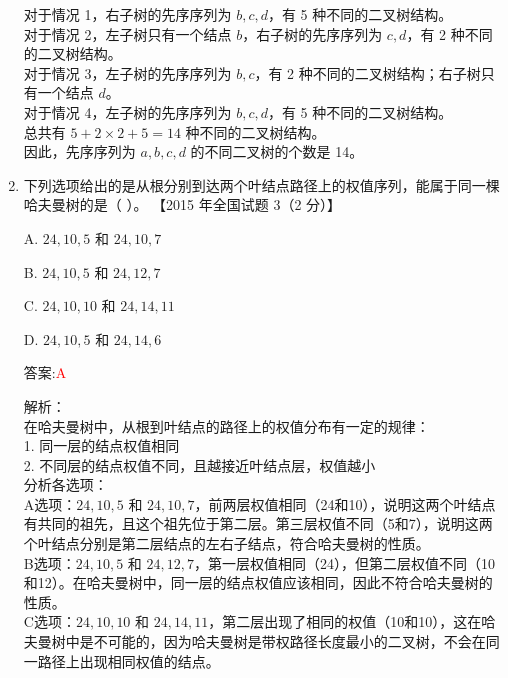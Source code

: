 \documentclass[lang=cn,newtx,10pt,scheme=chinese]{../../../elegantbook}
\begin{document}
\begin{enumerate}
        对于情况 1，右子树的先序序列为 $b, c, d$，有 5 种不同的二叉树结构。\\
        对于情况 2，左子树只有一个结点 $b$，右子树的先序序列为 $c, d$，有 2 种不同的二叉树结构。\\
        对于情况 3，左子树的先序序列为 $b, c$，有 2 种不同的二叉树结构；右子树只有一个结点 $d$。\\
        对于情况 4，左子树的先序序列为 $b, c, d$，有 5 种不同的二叉树结构。\\
        
        总共有 $5 + 2 \times 2 + 5 = 14$ 种不同的二叉树结构。\\
        
        因此，先序序列为 $a, b, c, d$ 的不同二叉树的个数是 14。\\

    \item 下列选项给出的是从根分别到达两个叶结点路径上的权值序列，能属于同一棵哈夫曼树的是（ ）。  
    【2015 年全国试题 3（2 分）】  

    A. $24, 10, 5$ 和 $24, 10, 7$

    B. $24, 10, 5$ 和 $24, 12, 7$  

    C. $24, 10, 10$ 和 $24, 14, 11$  

    D. $24, 10, 5$ 和 $24, 14, 6$  
    
    答案:\textcolor{red}{A}
    
    解析：\\
    在哈夫曼树中，从根到叶结点的路径上的权值分布有一定的规律：\\
    1. 同一层的结点权值相同\\
    2. 不同层的结点权值不同，且越接近叶结点层，权值越小\\
    
    分析各选项：\\
    A选项：$24, 10, 5$ 和 $24, 10, 7$，前两层权值相同（24和10），说明这两个叶结点有共同的祖先，且这个祖先位于第二层。第三层权值不同（5和7），说明这两个叶结点分别是第二层结点的左右子结点，符合哈夫曼树的性质。\\
    
    B选项：$24, 10, 5$ 和 $24, 12, 7$，第一层权值相同（24），但第二层权值不同（10和12）。在哈夫曼树中，同一层的结点权值应该相同，因此不符合哈夫曼树的性质。\\
    
    C选项：$24, 10, 10$ 和 $24, 14, 11$，第二层出现了相同的权值（10和10），这在哈夫曼树中是不可能的，因为哈夫曼树是带权路径长度最小的二叉树，不会在同一路径上出现相同权值的结点。\\
    

\end{enumerate}
\end{document}
